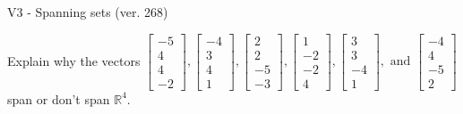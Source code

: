 \begin{exercise}
  \begin{exerciseTitle}V3 - Spanning sets (ver. 268)\end{exerciseTitle}
  \begin{exerciseStatement}
    Explain why the vectors \(\left[\begin{array}{r}
-5 \\
4 \\
4 \\
-2
\end{array}\right] , \left[\begin{array}{r}
-4 \\
3 \\
4 \\
1
\end{array}\right] , \left[\begin{array}{r}
2 \\
2 \\
-5 \\
-3
\end{array}\right] , \left[\begin{array}{r}
1 \\
-2 \\
-2 \\
4
\end{array}\right] , \left[\begin{array}{r}
3 \\
3 \\
-4 \\
1
\end{array}\right] , \text{ and } \left[\begin{array}{r}
-4 \\
4 \\
-5 \\
2
\end{array}\right]\) span or don't span \(\mathbb{R}^4\). 
	



\end{exerciseStatement}
\end{exercise}
